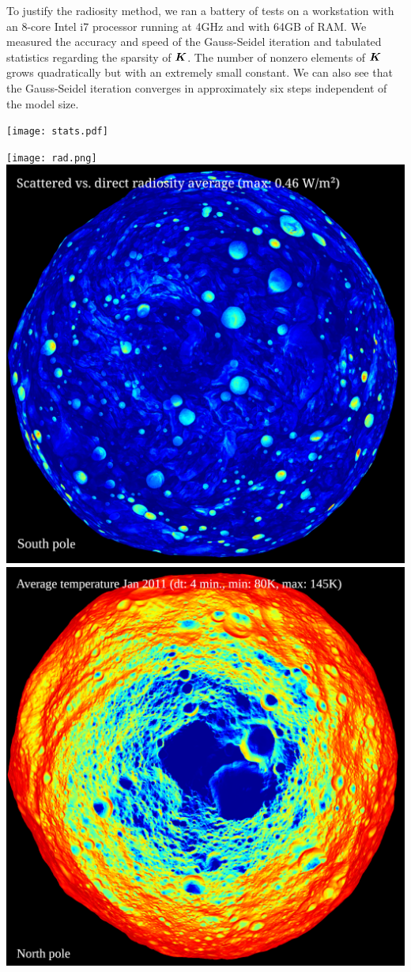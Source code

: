 \documentclass[final,paperwidth=36in,paperheight=45in]{baposter}
\begin{document}
\begin{poster}
  {
    To justify the radiosity method, we ran a battery of tests on a
    workstation with an 8-core Intel i7 processor running at 4GHz and
    with 64GB of RAM. We measured the accuracy and speed of the
    Gauss-Seidel iteration and tabulated statistics regarding the
    sparsity of $\boldsymbol{K}$. The number of nonzero elements of $\boldsymbol{K}$
    grows quadratically but with an extremely small constant. We can
    also see that the Gauss-Seidel iteration converges in
    approximately six steps independent of the model size.
    \begin{center}
      \texttt{[image: stats.pdf]}
    \end{center}
    \vspace{0.03em}
  }

  {
    \texttt{[image: rad.png]}
    \includegraphics[width=\linewidth]{diff_rad_avg.png}
    \includegraphics[width=0.495\linewidth]{therm_avg.png}
}
\end{poster}
\end{document}
